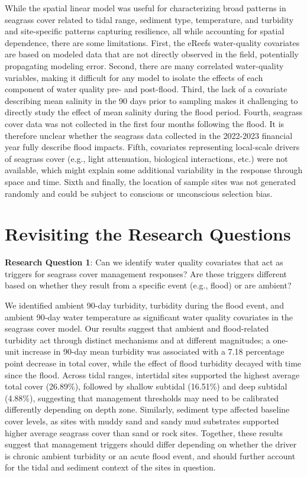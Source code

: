 \documentclass[
  letterpaper,
  DIV=11,
  numbers=noendperiod]{scrartcl}
\begin{document}
While the spatial linear model was useful for characterizing broad
patterns in seagrass cover related to tidal range, sediment type,
temperature, and turbidity and site-specific patterns capturing
resilience, all while accounting for spatial dependence, there are some
limitations. First, the eReefs water-quality covariates are based on
modeled data that are not directly observed in the field, potentially
propagating modeling error. Second, there are many correlated
water-quality variables, making it difficult for any model to isolate
the effects of each component of water quality pre- and post-flood.
Third, the lack of a covariate describing mean salinity in the 90 days
prior to sampling makes it challenging to directly study the effect of
mean salinity during the flood period. Fourth, seagrass cover data was
not collected in the first four months following the flood. It is
therefore unclear whether the seagrass data collected in the 2022-2023
financial year fully describe flood impacts. Fifth, covariates
representing local-scale drivers of seagrass cover (e.g., light
attenuation, biological interactions, etc.) were not available, which
might explain some additional variability in the response through space
and time. Sixth and finally, the location of sample sites was not
generated randomly and could be subject to conscious or unconscious
selection bias.

\section{Revisiting the Research
Questions}\label{revisiting-the-research-questions}

\textbf{Research Question 1}: Can we identify water quality covariates
that act as triggers for seagrass cover management responses? Are these
triggers different based on whether they result from a specific event
(e.g., flood) or are ambient?

We identified ambient 90-day turbidity, turbidity during the flood
event, and ambient 90-day water temperature as significant water quality
covariates in the seagrass cover model. Our results suggest that ambient
and flood-related turbidity act through distinct mechanisms and at
different magnitudes; a one-unit increase in 90-day mean turbidity was
associated with a 7.18 percentage point decrease in total cover, while
the effect of flood turbidity decayed with time since the flood. Across
tidal ranges, intertidal sites supported the highest average total cover
(26.89\%), followed by shallow subtidal (16.51\%) and deep subtidal
(4.88\%), suggesting that management thresholds may need to be
calibrated differently depending on depth zone. Similarly, sediment type
affected baseline cover levels, as sites with muddy sand and sandy mud
substrates supported higher average seagrass cover than sand or rock
sites. Together, these results suggest that management triggers should
differ depending on whether the driver is chronic ambient turbidity or
an acute flood event, and should further account for the tidal and
sediment context of the sites in question.
\end{document}
